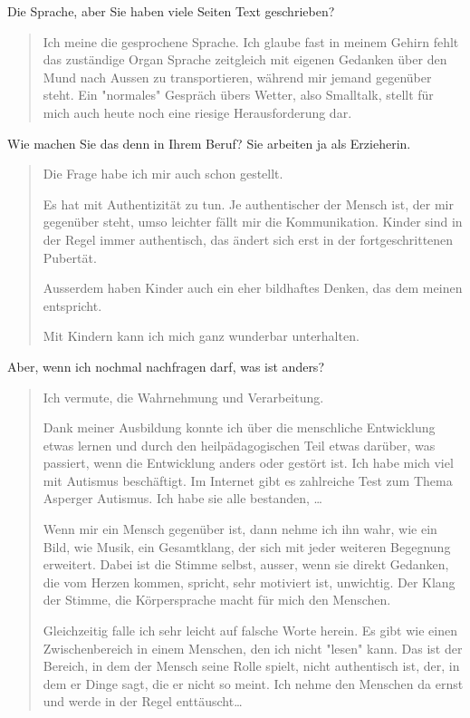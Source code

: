 \documentclass[10pt,titlepage,a5paper]{book}
\newenvironment{tg}{\begin{quote}\em}{\end{quote}}
\begin{document}
 Die Sprache, aber Sie haben viele Seiten Text geschrieben?
 
 \begin{tg}
 
 Ich meine die gesprochene Sprache. Ich glaube fast in meinem Gehirn fehlt das zuständige Organ Sprache zeitgleich mit eigenen Gedanken über den Mund nach Aussen zu transportieren, während mir jemand gegenüber steht. Ein "normales" Gespräch übers Wetter, also Smalltalk, stellt für mich auch heute noch eine riesige Herausforderung dar.
 
 \end{tg}
 
Wie machen Sie das denn in Ihrem Beruf? Sie arbeiten ja als Erzieherin.

\begin{tg}

Die Frage habe ich mir auch schon gestellt. 

Es hat mit Authentizität zu tun. Je authentischer der Mensch ist, der mir gegenüber steht, umso leichter fällt mir die Kommunikation. Kinder sind in der Regel immer authentisch, das ändert sich erst in der fortgeschrittenen Pubertät.

Ausserdem haben Kinder auch ein eher bildhaftes Denken, das dem meinen entspricht.

Mit Kindern kann ich mich ganz wunderbar unterhalten.



\end{tg}

Aber, wenn ich nochmal nachfragen darf, was ist anders?

\begin{tg}

Ich vermute, die Wahrnehmung und Verarbeitung.

Dank meiner Ausbildung konnte ich über die menschliche Entwicklung etwas lernen und durch den heilpädagogischen Teil etwas darüber, was passiert, wenn die Entwicklung anders oder gestört ist.
Ich habe mich viel mit Autismus beschäftigt. Im Internet gibt es zahlreiche Test zum Thema Asperger Autismus. Ich habe sie alle bestanden, \dots 

 Wenn mir ein Mensch gegenüber ist, dann nehme ich ihn wahr, wie ein Bild, wie Musik, ein Gesamtklang, der sich mit jeder weiteren Begegnung erweitert. Dabei ist die Stimme selbst, ausser, wenn sie direkt Gedanken, die vom Herzen kommen, spricht, sehr motiviert ist, unwichtig. Der Klang der Stimme, die Körpersprache macht für mich den Menschen. 
 
 Gleichzeitig falle ich sehr leicht auf falsche Worte herein. Es gibt wie einen Zwischenbereich in einem Menschen, den ich nicht "lesen"{} kann. Das ist der Bereich, in dem der Mensch seine Rolle spielt, nicht authentisch ist, der, in dem er Dinge sagt, die er nicht so meint. Ich nehme den Menschen da ernst und werde in der Regel enttäuscht\dots 


\end{tg}
\end{document}
